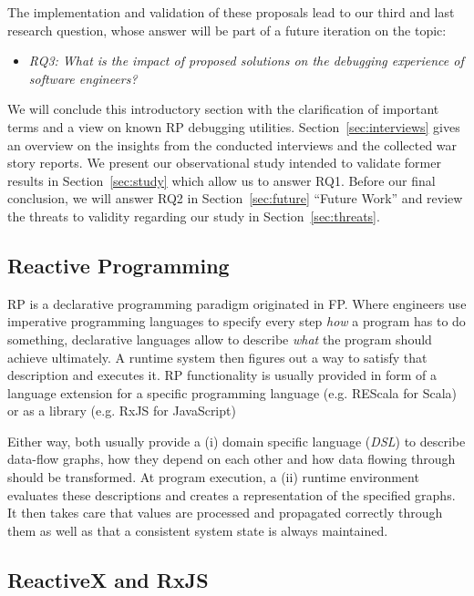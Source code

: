 \documentclass[sigplan,screen,review]{acmart}
\begin{document}
The implementation and validation of these proposals lead to our third and last research question, whose answer will be part of a future iteration on the topic:

\begin{itemize}
	\item \emph{RQ3: What is the impact of proposed solutions on the debugging experience of software engineers?}
\end{itemize}

We will conclude this introductory section with the clarification of important terms and a view on known RP debugging utilities. Section~\ref{sec:interviews} gives an overview on the insights from the conducted interviews and the collected war story reports. We present our observational study intended to validate former results in Section~\ref{sec:study} which allow us to answer RQ1. Before our final conclusion, we will answer RQ2 in Section~\ref{sec:future} ``Future Work'' and review the threats to validity regarding our study in Section~\ref{sec:threats}.

\subsection{Reactive Programming}

RP is a declarative programming paradigm originated in FP. Where engineers use imperative programming languages to specify every step \emph{how} a program has to do something, declarative languages allow to describe \emph{what} the program should achieve ultimately. A runtime system then figures out a way to satisfy that description and executes it. RP functionality is usually provided in form of a language extension for a specific programming language (e.g. REScala for Scala\cite{10.1145/2577080.2577083}) or as a library (e.g. RxJS for JavaScript\cite{rxjs})

Either way, both usually provide a (i) domain specific language (\emph{DSL}) to describe data-flow graphs, how they depend on each other and how data flowing through should be transformed. At program execution, a (ii) runtime environment evaluates these descriptions and creates a representation of the specified graphs. It then takes care that values are processed and propagated correctly through them as well as that a consistent system state\cite{10.1145/2501654.2501666} is always maintained.

\subsection{ReactiveX and RxJS}
\end{document}
